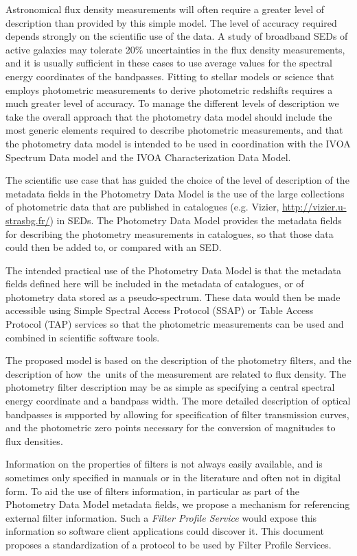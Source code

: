 \documentclass[11pt,a4paper]{ivoa}
\begin{document}
Astronomical flux density measurements will often require a 
greater level of description than provided by this simple model. 
The level of accuracy required depends strongly on the scientific 
use of the data. A study of broadband SEDs of active galaxies may 
tolerate 20$\%$  uncertainties in the flux density measurements, 
and it is usually sufficient in these cases to use average values 
for the spectral energy coordinates of the bandpasses. Fitting to 
stellar models or science that employs photometric measurements to 
derive photometric redshifts requires a much greater level of accuracy. 
To manage the different levels of description we take the overall 
approach that the photometry data model should include the most 
generic elements required to describe photometric measurements, 
and that the photometry data model is intended to be used in 
coordination with the IVOA Spectrum Data model and the IVOA 
Characterization Data Model.

The scientific use case that has guided the choice of the level 
of description of the metadata fields in the Photometry Data Model 
is the use of the large collections of photometric data that are 
published in catalogues (e.g. Vizier, \url{http://vizier.u-strasbg.fr/}) 
in SEDs. The Photometry Data Model provides the metadata fields for 
describing the photometry measurements in catalogues, so that those 
data could then be added to, or compared with an SED.

The intended practical use of the Photometry Data Model is that the 
metadata fields defined here will be included in the metadata of 
catalogues, or of photometry data stored as a pseudo-spectrum. These 
data would then be made accessible using Simple Spectral Access Protocol 
(SSAP) or Table Access Protocol (TAP) services so that the photometric 
measurements can be used and combined in scientific software tools.

The proposed model is based on the description of the photometry 
filters, and the description of how\ the\ units of the measurement 
are related to flux density. The photometry filter description may 
be as simple as specifying a central spectral energy coordinate and 
a bandpass width. The more detailed description of optical bandpasses 
is supported by allowing for specification of filter transmission 
curves, and the   photometric zero points necessary for the conversion 
of magnitudes to flux densities.

Information on the properties of filters is not always easily available, 
and is sometimes only specified in manuals or in the literature and often 
not in digital form. To aid the use of filters information, in particular 
as part of the Photometry Data Model metadata fields, we propose a 
mechanism for referencing external filter information. Such a 
\textit{Filter Profile Service} would expose this information so software 
client applications could discover it. This document proposes a 
standardization of a protocol to be used by Filter Profile Services.
\end{document}
